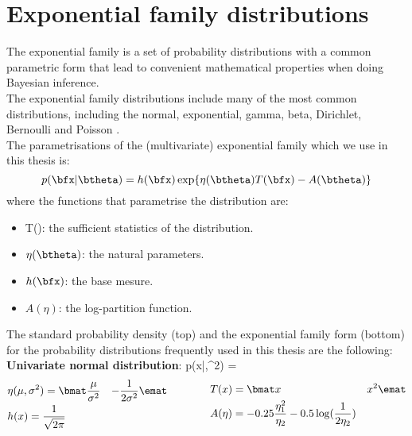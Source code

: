 \section{Exponential family distributions}

The exponential family is a set of probability distributions with a common parametric form that lead to convenient mathematical properties when doing Bayesian inference\cite{??}. \\
The exponential family distributions include many of the most common distributions, including the normal, exponential, gamma, beta, Dirichlet, Bernoulli and Poisson \cite{???}.\\ 

The parametrisations of the (multivariate) exponential family which we use in this thesis is:
\[
p(\bfx|\btheta) = h(\bfx) \exp \{ \eta(\btheta) T(\bfx) - A(\btheta) \}
\]
where the functions that parametrise the distribution are:
\begin{itemize}
	\item T(\bfx): the sufficient statistics of the distribution.
	\item $\eta(\btheta)$: the natural parameters.
	\item $h(\bfx)$: the base mesure.
	\item $A(\eta)$: the log-partition function.
\end{itemize}

The standard probability density (top) and the exponential family form (bottom) for the probability distributions frequently used in this thesis are the following:\\

\textbf{Univariate normal distribution}:
\beq 
	p(x|\mu,\sigma^2) =  
\eeq
\begin{equation}
\begin{split}
	& \eta(\mu,\sigma^2) = \bmat \frac{\mu}{\sigma^2} & -\frac{1}{2\sigma^2} \emat \\
	& h(x) = \frac{1}{\sqrt{2\pi}}
\end{split}
\qquad \qquad
\begin{split}
	& T(x) = \bmat x & x^2 \emat \\
	&  A(\eta) = -0.25\frac{\eta_1^2}{\eta_2} - 0.5\log(\frac{1}{2\eta_2}) %
\end{split}
\end{equation}

